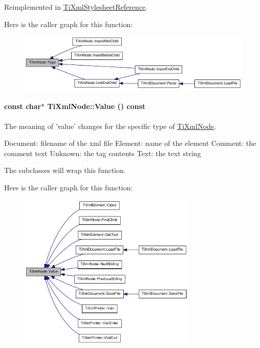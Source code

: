 Reimplemented in \hyperlink{class_ti_xml_stylesheet_reference_a3d970eb6637390f512a918ca0407cdc1}{TiXmlStylesheetReference}.

Here is the caller graph for this function:\nopagebreak
\begin{figure}[H]
\begin{center}
\leavevmode
\includegraphics[width=324pt]{class_ti_xml_node_a57b99d5c97d67a42b9752f5210a1ba5e_icgraph}
\end{center}
\end{figure}
\hypertarget{class_ti_xml_node_a77943eb90d12c2892b1337a9f5918b41}{
\paragraph[{Value}]{\setlength{\rightskip}{0pt plus 5cm}const char$\ast$ TiXmlNode::Value () const}\hfill}
\label{class_ti_xml_node_a77943eb90d12c2892b1337a9f5918b41}
The meaning of 'value' changes for the specific type of \hyperlink{class_ti_xml_node}{TiXmlNode}. \begin{DoxyVerb}
		Document:	filename of the xml file
		Element:	name of the element
		Comment:	the comment text
		Unknown:	the tag contents
		Text:		the text string
		\end{DoxyVerb}


The subclasses will wrap this function. 

Here is the caller graph for this function:\nopagebreak
\begin{figure}[H]
\begin{center}
\leavevmode
\includegraphics[width=239pt]{class_ti_xml_node_a77943eb90d12c2892b1337a9f5918b41_icgraph}
\end{center}
\end{figure}


